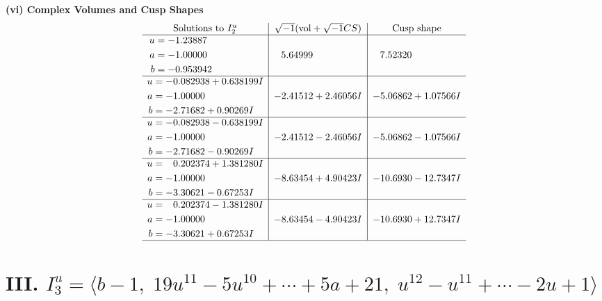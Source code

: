 \documentclass[1p]{elsarticle_modified}
\theoremstyle{definition}
\newcommand{\I}{\sqrt{-1}}
\begin{document}
\newpage\flushleft \textbf{(vi) Complex Volumes and Cusp Shapes}
$$\begin{array}{c|c|c}  
\text{Solutions to }I^u_{2}& \I (\text{vol} + \sqrt{-1}CS) & \text{Cusp shape}\\
 \hline 
\begin{aligned}
u &= -1.23887\phantom{ +0.000000I} \\
a &= -1.00000\phantom{ +0.000000I} \\
b &= -0.953942\phantom{ +0.000000I}\end{aligned}
 & \phantom{-}5.64999\phantom{ +0.000000I} & \phantom{-}7.52320\phantom{ +0.000000I} \\ \hline\begin{aligned}
u &= -0.082938 + 0.638199 I \\
a &= -1.00000\phantom{ +0.000000I} \\
b &= -2.71682 + 0.90269 I\end{aligned}
 & -2.41512 + 2.46056 I & -5.06862 + 1.07566 I \\ \hline\begin{aligned}
u &= -0.082938 - 0.638199 I \\
a &= -1.00000\phantom{ +0.000000I} \\
b &= -2.71682 - 0.90269 I\end{aligned}
 & -2.41512 - 2.46056 I & -5.06862 - 1.07566 I \\ \hline\begin{aligned}
u &= \phantom{-}0.202374 + 1.381280 I \\
a &= -1.00000\phantom{ +0.000000I} \\
b &= -3.30621 - 0.67253 I\end{aligned}
 & -8.63454 + 4.90423 I & -10.6930 - 12.7347 I \\ \hline\begin{aligned}
u &= \phantom{-}0.202374 - 1.381280 I \\
a &= -1.00000\phantom{ +0.000000I} \\
b &= -3.30621 + 0.67253 I\end{aligned}
 & -8.63454 - 4.90423 I & -10.6930 + 12.7347 I\\
 \hline 
 \end{array}$$\newpage\newpage\renewcommand{\arraystretch}{1}
\centering \section*{III. $I^u_{3}= \langle b-1,\;19 u^{11}-5 u^{10}+\cdots+5 a+21,\;u^{12}- u^{11}+\cdots-2 u+1 \rangle$}
\end{document}
